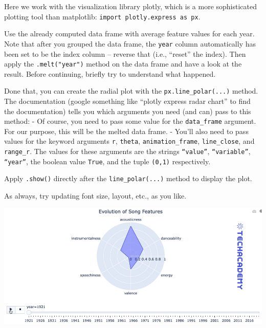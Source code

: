 \documentclass[
  11pt,
]{book}
\newenvironment{tipsp}[1]
  {
  \begin{itemize}
  \footnotesize
  \renewcommand{\labelitemi}{
    \raisebox{-.7\height}[0pt][0pt]{
      {\setkeys{Gin}{width=3em,keepaspectratio}
        \texttt{[image: images/\#1.png]}}
    }
  }
  \setlength{\fboxsep}{1em}
  \begin{pbox}
  \item
  }
  {
  \end{pbox}
  \end{itemize}
  }
\begin{document}
\begin{tipsp}p

Here we work with the visualization library plotly, which is a more sophisticated plotting tool than matplotlib:
\texttt{import\ plotly.express\ as\ px}.

Use the already computed data frame with average feature values for each year. Note that after you grouped the data frame, the \texttt{year} column automatically has been set to be the index column -- reverse that (i.e., ``reset'' the index).
Then apply the \texttt{.melt("year")} method on the data frame and have a look at the result. Before continuing, briefly try to understand what happened.

Done that, you can create the radial plot with the \texttt{px.line\_polar(...)} method. The documentation (google something like ``plotly express radar chart'' to find the documentation) tells you which arguments you need (and can) pass to this method:
- Of course, you need to pass some value for the \texttt{data\_frame} argument. For our purpose, this will be the melted data frame.
- You'll also need to pass values for the keyword arguments \texttt{r}, \texttt{theta}, \texttt{animation\_frame}, \texttt{line\_close}, and \texttt{range\_r}.
The values for these arguments are the strings \texttt{“value”}, \texttt{“variable”}, \texttt{“year”}, the boolean value \texttt{True}, and the tuple \texttt{(0,1)} respectively.

Apply \texttt{.show()} directly after the \texttt{line\_polar(...)} method to display the plot.

As always, try updating font size, layout, etc., as you like.

\end{tipsp}

\begin{center}\includegraphics[width=1\linewidth]{splots/spider} \end{center}
\end{document}

